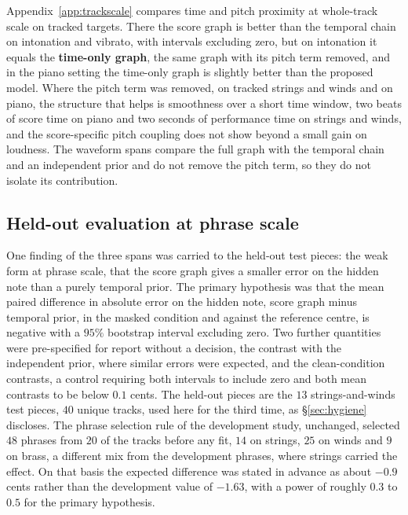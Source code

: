 \documentclass[11pt,a4paper]{report}
\begin{document}
Appendix~\ref{app:trackscale} compares time and pitch proximity at
whole-track scale on tracked targets. There the score graph is better
than the temporal chain on intonation and vibrato, with intervals excluding
zero, but on intonation it equals the \textbf{time-only graph}, the same
graph with its pitch term removed, and in the piano setting the time-only
graph is slightly better than the proposed model. Where the pitch term was
removed, on tracked strings and winds and on piano, the structure that
helps is smoothness over a short time window, two beats of score time on
piano and two seconds of performance time on strings and winds, and the
score-specific pitch coupling does not show beyond a small gain on
loudness. The waveform spans compare the full graph with the temporal chain
and an independent prior and do not remove the pitch term, so they do not
isolate its contribution.

\subsection{Held-out evaluation at phrase scale}\label{sec:phase3-heldout}
One finding of the three spans was carried to the held-out test pieces:
the weak form at phrase scale, that the score graph gives a smaller error
on the hidden note than a purely temporal prior. The primary hypothesis was that the mean paired
difference in absolute error on the hidden note, score graph minus
temporal prior, in the masked condition and against the reference
centre, is negative with a $95\%$ bootstrap interval excluding zero. Two
further quantities were pre-specified for report without a decision, the contrast with
the independent prior, where similar errors were expected, and the
clean-condition contrasts, a control requiring both intervals to include
zero and both mean contrasts to be below $0.1$ cents.
The held-out pieces are the $13$ strings-and-winds test pieces, $40$ unique
tracks, used here for the third time, as \S\ref{sec:hygiene} discloses.
The phrase selection rule of the development study, unchanged,
selected $48$ phrases from $20$ of the tracks before any fit, $14$ on
strings, $25$ on winds and $9$ on brass, a different mix from the
development phrases, where strings carried the effect. On that basis the
expected difference was stated in advance as about $-0.9$ cents rather
than the development value of $-1.63$, with a power of roughly $0.3$ to
$0.5$ for the primary hypothesis.
\end{document}
